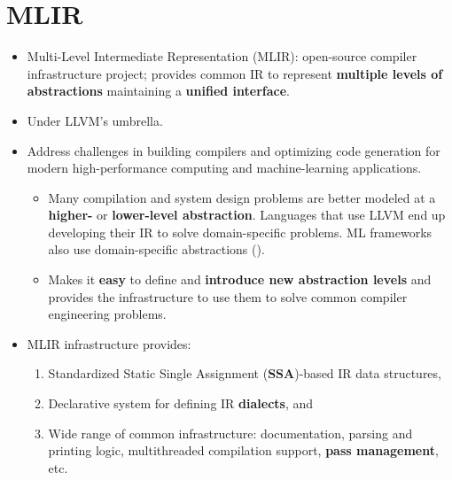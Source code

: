 \documentclass[8pt,a4paper,oneside,hidelinks,aspectratio=169,dvipsnames]{beamer}
\begin{document}
\section{MLIR}

\begin{frame}{}
  \begin{itemize}
    \item Multi-Level Intermediate Representation (MLIR): open-source compiler infrastructure project; provides common IR to represent \textbf{multiple levels of abstractions} maintaining a \textbf{unified interface}.
    \item Under LLVM's umbrella.
    \item Address challenges in building compilers and optimizing code generation for modern high-performance computing and machine-learning applications.
          \begin{itemize}
            \item Many compilation and system design problems are better modeled at a \textbf{higher-} or \textbf{lower-level abstraction}. Languages that use LLVM end up developing their IR to solve domain-specific problems. ML frameworks also use domain-specific abstractions ().
            \item Makes it \textbf{easy} to define and \textbf{introduce new abstraction levels} and provides the infrastructure to use them to solve common compiler engineering problems.
          \end{itemize}
    \item MLIR infrastructure provides:
          \begin{enumerate}
            \item Standardized Static Single Assignment (\textbf{SSA})-based IR data structures,
            \item Declarative system for defining IR \textbf{dialects}, and
            \item Wide range of common infrastructure: documentation, parsing and printing logic, multithreaded compilation support, \textbf{pass management}, etc.
          \end{enumerate}
  \end{itemize}
\end{frame}
\end{document}
